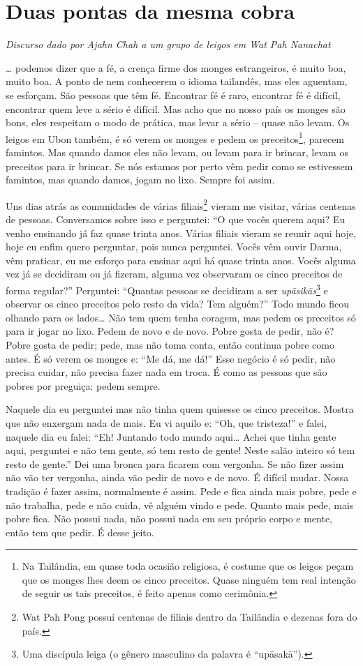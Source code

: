 
\chapter{Duas pontas da mesma cobra}

{\itshape
Discurso dado por Ajahn Chah a um grupo de leigos em Wat Pah Nanachat}

… podemos dizer que a fé, a crença firme dos monges estrangeiros, é
muito boa, muito boa. A ponto de nem conhecerem o idioma tailandês, mas
eles aguentam, se esforçam. São pessoas que têm fé. Encontrar fé é
raro, encontrar fé é difícil, encontrar quem leve a sério é difícil.
Mas acho que no nosso país os monges são bons, eles respeitam o modo de
prática, mas levar a sério – quase não levam. Os
leigos em Ubon também, é só verem os monges e pedem os
preceitos\footnote{Na Tailândia, em quase toda ocasião religiosa, é
costume que os leigos peçam que os monges lhes deem os cinco preceitos.
Quase ninguém tem real intenção de seguir os tais preceitos, é feito
apenas como cerimônia.}, parecem famintos. Mas quando damos eles não
levam, ou levam para ir brincar, levam os preceitos para ir brincar. Se
nós estamos por perto vêm pedir como se estivessem famintos, mas quando
damos, jogam no lixo. Sempre foi assim. 

Uns dias atrás as comunidades de várias filiais\footnote{Wat Pah
Pong possui centenas de filiais dentro da Tailândia e dezenas fora do
país.} vieram me visitar, várias centenas de pessoas. Conversamos sobre
isso e perguntei: “O que vocês querem aqui? Eu venho ensinando já faz
quase trinta anos. Várias filiais vieram se reunir aqui hoje, hoje eu
enfim quero perguntar, pois nunca perguntei. Vocês vêm ouvir Darma, vêm
praticar, eu me esforço para ensinar aqui há quase trinta anos. Vocês
alguma vez já se decidiram ou já fizeram, alguma vez observaram os
cinco preceitos de forma regular?” Perguntei: “Quantas pessoas se
decidiram a ser \textit{upāsikās}\footnote{Uma discípula leiga (o
gênero masculino da palavra é “upāsakā”).} e observar os
cinco preceitos pelo resto da vida? Tem alguém?” Todo mundo ficou
olhando para os lados… Não tem quem tenha coragem, mas pedem os
preceitos só para ir jogar no lixo. Pedem de novo e de novo. Pobre
gosta de pedir, não é? Pobre gosta de pedir; pede, mas não toma conta,
então continua pobre como antes. É só verem os monges e: “Me dá, me
dá!” Esse negócio é só pedir, não precisa cuidar, não precisa fazer
nada em troca. É como as pessoas que são pobres por
preguiça: pedem sempre. 

Naquele dia eu perguntei mas não tinha quem quisesse os cinco
preceitos. Mostra que não enxergam nada de mais. Eu vi aquilo e: “Oh,
que tristeza!” e falei, naquele dia eu falei: “Eh! Juntando todo mundo
aqui… Achei que tinha gente aqui, perguntei e não tem gente, só tem
resto de gente! Neste salão inteiro só tem resto de gente.” Dei uma
bronca para ficarem com vergonha. Se não fizer assim não vão ter
vergonha, ainda vão pedir de novo e de novo. É difícil mudar. Nossa
tradição é fazer assim, normalmente é assim. Pede e fica ainda mais
pobre, pede e não trabalha, pede e não cuida, vê alguém vindo e pede.
Quanto mais pede, mais pobre fica. Não possui nada, não possui nada em
seu próprio corpo e mente, então tem que pedir. É desse jeito.


